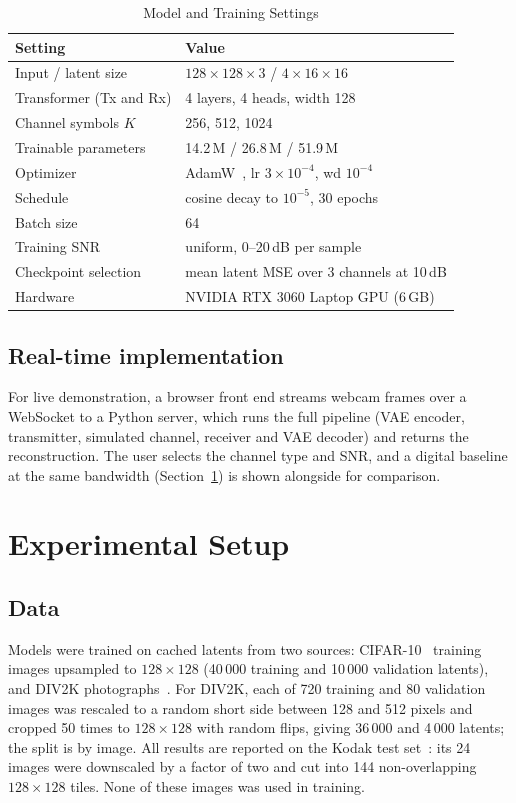 \documentclass[conference]{IEEEtran}
\begin{document}
\begin{table}[t]
\centering
\caption{Model and Training Settings}
\label{tab:params}
\begin{tabular}{@{}ll@{}}
\toprule
Setting & Value \\
\midrule
Input / latent size & $128\times128\times3$ / $4\times16\times16$ \\
Transformer (Tx and Rx) & 4 layers, 4 heads, width 128 \\
Channel symbols $K$ & 256, 512, 1024 \\
Trainable parameters & 14.2\,M / 26.8\,M / 51.9\,M \\
Optimizer & AdamW~\cite{loshchilov2019adamw}, lr $3\times10^{-4}$, wd $10^{-4}$ \\
Schedule & cosine decay to $10^{-5}$, 30 epochs \\
Batch size & 64 \\
Training SNR & uniform, 0--20\,dB per sample \\
Checkpoint selection & mean latent MSE over 3 channels at 10\,dB \\
Hardware & NVIDIA RTX 3060 Laptop GPU (6\,GB) \\
\bottomrule
\end{tabular}
\end{table}

\subsection{Real-time implementation}
For live demonstration, a browser front end streams webcam frames over a WebSocket to a Python server, which runs the full pipeline (VAE encoder, transmitter, simulated channel, receiver and VAE decoder) and returns the reconstruction. The user selects the channel type and SNR, and a digital baseline at the same bandwidth (Section~\ref{sec:setup}) is shown alongside for comparison.

\section{Experimental Setup}\label{sec:setup}
\subsection{Data}
Models were trained on cached latents from two sources: CIFAR-10~\cite{krizhevsky2009cifar} training images upsampled to $128\times128$ (40\,000 training and 10\,000 validation latents), and DIV2K photographs~\cite{agustsson2017div2k}. For DIV2K, each of 720 training and 80 validation images was rescaled to a random short side between 128 and 512 pixels and cropped 50 times to $128\times128$ with random flips, giving 36\,000 and 4\,000 latents; the split is by image. All results are reported on the Kodak test set~\cite{kodak}: its 24 images were downscaled by a factor of two and cut into 144 non-overlapping $128\times128$ tiles. None of these images was used in training.
\end{document}
